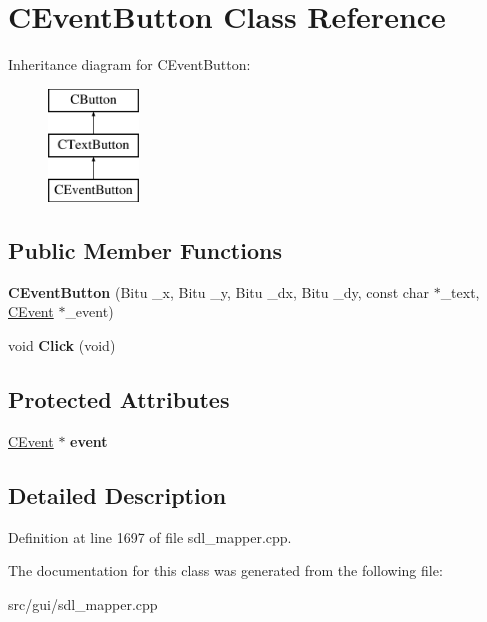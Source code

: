 \hypertarget{classCEventButton}{\section{C\-Event\-Button Class Reference}
\label{classCEventButton}
}
Inheritance diagram for C\-Event\-Button\-:\begin{figure}[H]
\begin{center}
\leavevmode
\includegraphics[height=3.000000cm]{classCEventButton}
\end{center}
\end{figure}
\subsection*{Public Member Functions}
\begin{DoxyCompactItemize}
\item 
\hypertarget{classCEventButton_a79fd3e96e7f7f1b3c4565f02535c3429}{{\bfseries C\-Event\-Button} (Bitu \-\_\-x, Bitu \-\_\-y, Bitu \-\_\-dx, Bitu \-\_\-dy, const char $\ast$\-\_\-text, \hyperlink{classCEvent}{C\-Event} $\ast$\-\_\-event)}\label{classCEventButton_a79fd3e96e7f7f1b3c4565f02535c3429}

\item 
\hypertarget{classCEventButton_ab88a51cd41e89b95cc7fbb7d78562fbe}{void {\bfseries Click} (void)}\label{classCEventButton_ab88a51cd41e89b95cc7fbb7d78562fbe}

\end{DoxyCompactItemize}
\subsection*{Protected Attributes}
\begin{DoxyCompactItemize}
\item 
\hypertarget{classCEventButton_a5f0d42f7b82112c4b144f84f308f1527}{\hyperlink{classCEvent}{C\-Event} $\ast$ {\bfseries event}}\label{classCEventButton_a5f0d42f7b82112c4b144f84f308f1527}

\end{DoxyCompactItemize}


\subsection{Detailed Description}


Definition at line 1697 of file sdl\-\_\-mapper.\-cpp.



The documentation for this class was generated from the following file\-:\begin{DoxyCompactItemize}
\item 
src/gui/sdl\-\_\-mapper.\-cpp\end{DoxyCompactItemize}
